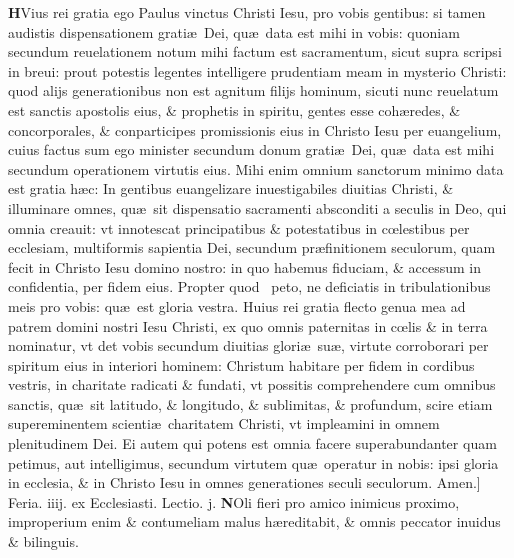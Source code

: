\documentclass[a5paper,10pt]{book}
\def\leftmarginnote{%
	\lrmarginnote{\hskip -\marginparsep \hskip -6.5em}}
\def\rightmarginnote{%
	\lrmarginnote{\hskip\columnwidth \hskip -1em}}
\def\ae{æ}
\def\oe{œ}
\begin{document}
\begin{multicols*}{2}
\vspace{-2.25em}
\lettrine[lines=2]{\bfseries \color{red} H}{}Vius\rightmarginnote{ca. 3.} rei gratia ego Paulus vinctus Christi Iesu, pro vobis gentibus: si tamen audistis dispensationem grati\ae \ Dei, qu\ae \ data est mihi in vobis: quoniam secundum reuelationem notum mihi factum est sacramentum, sicut supra scripsi in breui: prout potestis legentes intelligere prudentiam meam in mysterio Christi: quod alijs generationibus non est agnitum filijs hominum, sicuti nunc reuelatum est sanctis apostolis eius, \& prophetis in spiritu, gentes esse coh\ae redes, \& concorporales, \& conparticipes promissionis eius in Christo Iesu per euangelium, cuius factus sum ego minister secundum donum grati\ae \ Dei, qu\ae \ data est mihi secundum operationem virtutis eius.
Mihi enim omnium sanctorum minimo data est gratia h\ae c: In gentibus euangelizare
inuestigabiles diuitias Christi, \& illuminare omnes, qu\ae \ sit dispensatio sacramenti absconditi a seculis in Deo, qui omnia creauit: vt innotescat principatibus \& potestatibus in c\oe lestibus per ecclesiam, multiformis sapientia Dei, secundum pr\ae finitionem seculorum, quam fecit in Christo Iesu domino nostro: in quo habemus fiduciam, \& accessum in confidentia, per fidem eius.
Propter quod \textdagger \ 
peto,\leftmarginnote{\begin{flushright}B\end{flushright}} ne deficiatis in tribulationibus meis pro vobis: qu\ae \ est gloria vestra.
Huius rei gratia flecto genua mea ad patrem domini nostri Iesu Christi, ex quo omnis paternitas in c\oe lis \& in terra nominatur, vt det vobis secundum diuitias glori\ae \ su\ae , virtute corroborari per spiritum eius in interiori hominem: Christum habitare per fidem in cordibus vestris, in charitate radicati \& fundati, vt possitis comprehendere cum omnibus sanctis, qu\ae \ sit latitudo, \& longitudo, \& sublimitas, \& profundum, scire etiam supereminentem scienti\ae \ charitatem Christi, vt impleamini in omnem plenitudinem Dei.
Ei autem qui potens est omnia facere superabundanter quam petimus, aut intelligimus, secundum virtutem qu\ae \ operatur in nobis: ipsi gloria in ecclesia, \& in Christo Iesu in omnes generationes seculi seculorum. Amen.]
\newline \textswab{C} \color{red} \hypertarget{WED-SECVNDA-VAGAN}{Feria. iiij.} ex Ecclesiasti. Lectio. j. \color{black}
\bookmark[dest=WED-SECVNDA-VAGAN]{FERIA QVARTA}
\vspace{-2.25em}
\lettrine[lines=2]{\bfseries N}{}Oli\rightmarginnote{ca. 6.} fieri pro amico inimicus proximo, improperium enim \& contumeliam malus h\ae reditabit, \& omnis peccator inuidus \& bilinguis.

\end{multicols*}
\end{document}

